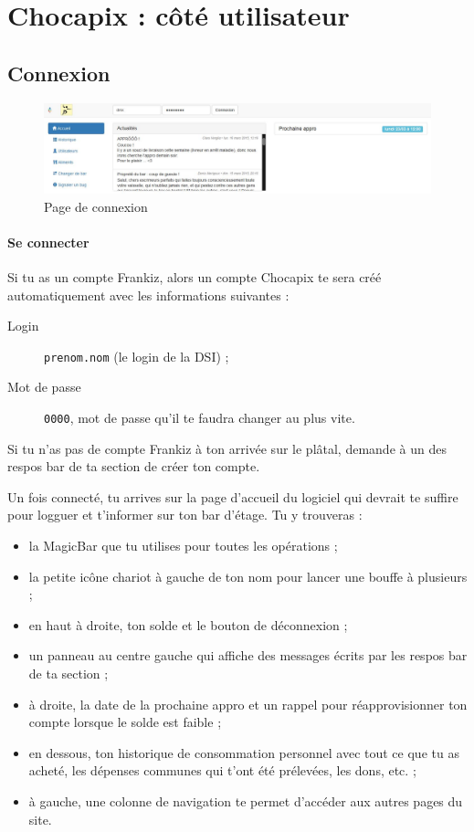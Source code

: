 \documentclass[12pt,french]{article}
\begin{document}
\section{Chocapix : côté utilisateur}

\subsection{Connexion}

\begin{figure}[h]
\centering
\includegraphics[width=16cm]{images/login}
\caption{Page de connexion}
\end{figure}

\paragraph{Se connecter} Si tu as un compte Frankiz, alors un compte Chocapix te sera créé automatiquement avec les informations suivantes :
\begin{description}
\item[Login] \texttt{prenom.nom} (le login de la DSI) ;
\item[Mot de passe] \texttt{0000}, mot de passe qu'il te faudra changer au plus vite.
\end{description}
Si tu n'as pas de compte Frankiz à ton arrivée sur le plâtal, demande à un des respos bar de ta section de créer ton compte.

Un fois connecté, tu arrives sur la page d'accueil du logiciel qui devrait te suffire pour logguer et t'informer sur ton bar d'étage. Tu y trouveras :
\begin{itemize}
	\item la MagicBar\texttrademark{} que tu utilises pour toutes les opérations ;
	\item la petite icône chariot à gauche de ton nom pour lancer une bouffe à plusieurs ;
	\item en haut à droite, ton solde et le bouton de déconnexion ;
	\item un panneau  au centre gauche qui affiche des messages écrits par les respos bar de ta section ;
	\item  à droite, la date de la prochaine appro et un rappel pour réapprovisionner ton compte lorsque le solde est faible ;
	\item en dessous, ton historique de consommation personnel avec tout ce que tu as acheté, les dépenses communes qui t'ont été prélevées, les dons, etc. ;
	\item à gauche, une colonne de navigation te permet d'accéder aux autres pages du site.
\end{itemize}
\end{document}
